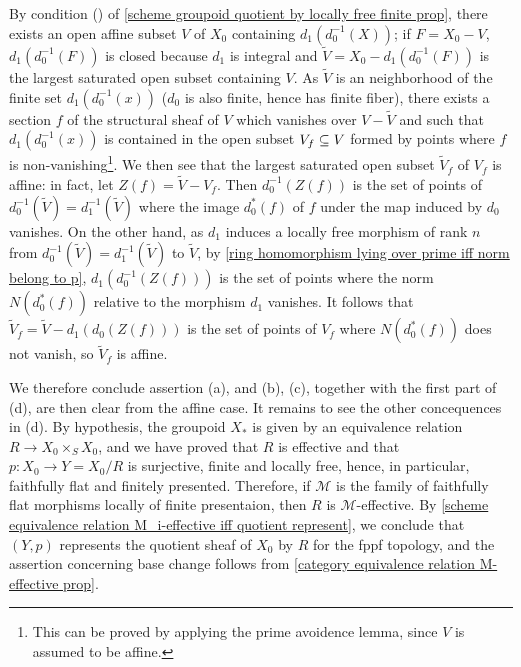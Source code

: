 By condition () of \cref{scheme groupoid quotient by locally free finite prop}, there exists an open affine subset $V$ of $X_0$ containing $d_1(d_0^{-1}(X))$; if $F=X_0-V$, $d_1(d_0^{-1}(F))$ is closed because $d_1$ is integral and $\widetilde{V}=X_0-d_1(d_0^{-1}(F))$ is the largest saturated open subset containing $V$. As $\widetilde{V}$ is an neighborhood of the finite set $d_1(d_0^{-1}(x))$ ($d_0$ is also finite, hence has finite fiber), there exists a section $f$ of the structural sheaf of $V$ which vanishes over $V-\widetilde{V}$ and such that $d_1(d_0^{-1}(x))$ is contained in the open subset $V_f\subseteq V$ formed by points where $f$ is non-vanishing\footnote{This can be proved by applying the prime avoidence lemma, since $V$ is assumed to be affine.}. We then see that the largest saturated open subset $\widetilde{V}_f$ of $V_f$ is affine: in fact, let $Z(f)=\widetilde{V}-V_f$. Then $d_0^{-1}(Z(f))$ is the set of points of $d_0^{-1}(\widetilde{V})=d_1^{-1}(\widetilde{V})$ where the image $d_0^*(f)$ of $f$ under the map induced by $d_0$ vanishes. On the other hand, as $d_1$ induces a locally free morphism of rank $n$ from $d_0^{-1}(\widetilde{V})=d_1^{-1}(\widetilde{V})$ to $\widetilde{V}$, by \cref{ring homomorphism lying over prime iff norm belong to p}, $d_1(d_0^{-1}(Z(f)))$ is the set of points where the norm $N(d_0^*(f))$ relative to the morphism $d_1$ vanishes. It follows that $\widetilde{V}_f=\widetilde{V}-d_1(d_0(Z(f)))$ is the set of points of $V_f$ where $N(d_0^*(f))$ does not vanish, so $\widetilde{V}_f$ is affine.\par
We therefore conclude assertion (a), and (b), (c), together with the first part of (d), are then clear from the affine case. It remains to see the other concequences in (d). By hypothesis, the groupoid $X_*$ is given by an equivalence relation $R\to X_0\times_SX_0$, and we have proved that $R$ is effective and that $p:X_0\to Y=X_0/R$ is surjective, finite and locally free, hence, in particular, faithfully flat and finitely presented. Therefore, if $\mathcal{M}$ is the family of faithfully flat morphisms locally of finite presentaion, then $R$ is $\mathcal{M}$-effective. By \cref{scheme equivalence relation M_i-effective iff quotient represent}, we conclude that $(Y,p)$ represents the quotient sheaf of $X_0$ by $R$ for the fppf topology, and the assertion concerning base change follows from \cref{category equivalence relation M-effective prop}.

